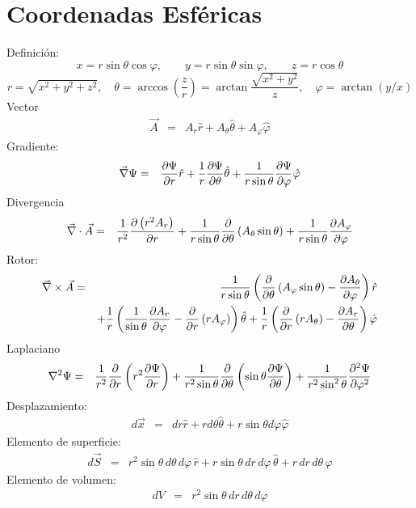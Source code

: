 \section{Coordenadas Esféricas}
Definición:
\begin{equation}
    x  =  r\sin\theta\cos\varphi, \qquad
    y  =  r\sin\theta\sin\varphi , \qquad
    z  =  r\cos\theta
\end{equation}
\begin{equation}
    r  =  \sqrt{x^2 + y^2 + z^2} , \quad
    \theta  =  \arccos(\frac{z}{r}) = \arctan{\frac{\sqrt{x^2+y^2}}{z}}, \quad
    \varphi  =  \arctan{(y/x)}
\end{equation}
Vector
\begin{eqnarray}
\vec{A}
&=& A_r {\hat r} + A_\theta {\hat \theta} +
A_\varphi {\hat \varphi}
\end{eqnarray}
Gradiente:
\begin{eqnarray}
 \vec\nabla\Psi
 &=& {\partial\Psi\over \partial r} {\hat r}
  + {1 \over r}{\partial\Psi\over \partial \theta} {\hat \theta}
  + {1 \over r\sin\theta}{\partial\Psi\over \partial \varphi} {\hat \varphi}
\end{eqnarray}
Divergencia
\begin{eqnarray}
 \vec\nabla \cdot \vec{A}
&=& {1 \over r^2}{\partial \left( r^2 A_r \right) \over \partial r}
  + {1 \over r\sin\theta}{\partial \over \partial \theta} \left(
A_\theta\sin\theta \right)
  + {1 \over r\sin\theta}{\partial A_\varphi \over \partial \varphi}
\end{eqnarray}
Rotor:
\begin{eqnarray}
\vec\nabla \times  \vec{A}
&=&  {1 \over r\sin\theta}\left({\partial \over \partial \theta}
\left( A_\varphi\sin\theta \right)    - {\partial A_\theta \over \partial
\varphi}\right) {\hat r} \nonumber\\
&&+    {1 \over r}\left({1 \over \sin\theta}{\partial A_r \over \partial
\varphi} - {\partial \over \partial r} \left( r A_\varphi \right) \right)
 {\hat \theta}  +   {1 \over r}\left({\partial \over \partial r} \left( r
A_\theta
\right)  - {\partial A_r \over \partial \theta}\right)  {\hat \varphi}
\end{eqnarray}
Laplaciano
\begin{eqnarray}
 \nabla^2 \Psi
&=&  {1 \over r^2}{\partial \over \partial r}\left(r^2 {\partial\Psi\over
\partial r}\right)   + {1 \over r^2\sin\theta}{\partial \over \partial
\theta}\left(\sin\theta {\partial\Psi\over \partial \theta}\right)
  + {1 \over r^2\sin^2\theta}{\partial^2\Psi\over \partial \varphi^2}
\end{eqnarray}
Desplazamiento:
\begin{eqnarray}
 d \vec{x}
&= & dr {\hat r} + rd\theta {\hat \theta} +r\sin\theta d\varphi {\hat \varphi}
\end{eqnarray}
Elemento de superficie:
\begin{eqnarray}
 d \vec{S}
&=& r^2 \sin\theta \,d\theta \,d\varphi \, {\hat r} + r\sin\theta
\,dr\,d\varphi \, {\hat \theta} +  r\,dr\,d\theta\, {\hat \varphi}
\end{eqnarray}
Elemento de volumen:
\begin{eqnarray}
 dV
&=& r^2\sin\theta \,dr\,d\theta\, d\varphi
\end{eqnarray}
